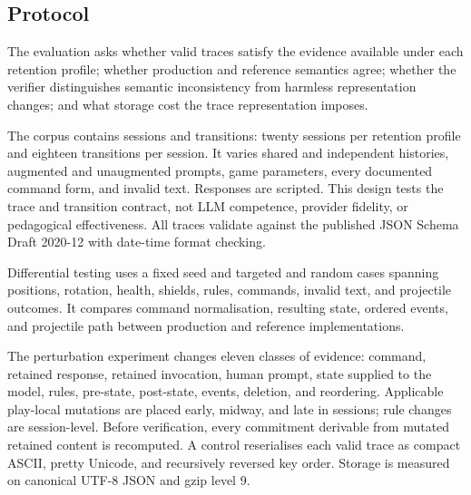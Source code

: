 \documentclass[conference,a4paper]{IEEEtran}
\begin{document}
\subsection{Protocol}
The evaluation asks whether valid traces satisfy the evidence available under each retention profile; whether production and reference semantics agree; whether the verifier distinguishes semantic inconsistency from harmless representation changes; and what storage cost the trace representation imposes.

The corpus contains \ResultSessions{} sessions and \ResultPlays{} transitions: twenty sessions per retention profile and eighteen transitions per session. It varies shared and independent histories, augmented and unaugmented prompts, game parameters, every documented command form, and invalid text. Responses are scripted. This design tests the trace and transition contract, not LLM competence, provider fidelity, or pedagogical effectiveness. All \ResultSchemaValid{} traces validate against the published JSON Schema Draft 2020-12 with date-time format checking.

Differential testing uses a fixed seed and \ResultDifferentialCases{} targeted and random cases spanning positions, rotation, health, shields, rules, commands, invalid text, and projectile outcomes. It compares command normalisation, resulting state, ordered events, and projectile path between production and reference implementations.

The perturbation experiment changes eleven classes of evidence: command, retained response, retained invocation, human prompt, state supplied to the model, rules, pre-state, post-state, events, deletion, and reordering. Applicable play-local mutations are placed early, midway, and late in sessions; rule changes are session-level. Before verification, every commitment derivable from mutated retained content is recomputed. A control reserialises each valid trace as compact ASCII, pretty Unicode, and recursively reversed key order. Storage is measured on canonical UTF-8 JSON and gzip level 9.
\end{document}
